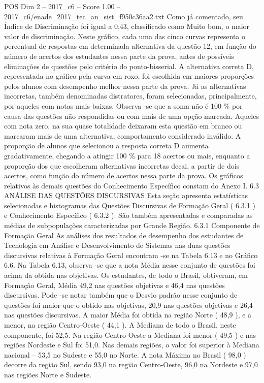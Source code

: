 \begin{textsample}{POS Dim 2 – 2017\_c6 – Score 1.00 – 2017\_c6/enade\_2017\_tec\_an\_sist\_f950c36aa2.txt}
Como já comentado, seu Índice de Discriminação foi igual a 0,43, classificado como Muito bom, o maior valor de discriminação.
Neste gráfico, cada uma das cinco curvas representa o percentual de respostas em determinada alternativa da questão 12, em função do número de acertos dos estudantes nessa parte da prova, antes de possíveis eliminações de questões pelo critério do ponto-bisserial.
A alternativa correta D, representada no gráfico pela curva em roxo, foi escolhida em maiores proporções pelos alunos com desempenho melhor nessa parte da prova.
Já as alternativas incorretas, também denominadas distratores, foram selecionadas, principalmente, por aqueles com notas mais baixas.
Observa -se que a soma não é 100 \% por causa das questões não respondidas ou com mais de uma opção marcada.
Aqueles com nota zero, na sua quase totalidade deixaram esta questão em branco ou marcaram mais de uma alternativa, comportamento considerado inválido.
A proporção de alunos que selecionou a resposta correta D aumenta gradativamente, chegando a atingir 100 \% para 18 acertos ou mais, enquanto a proporção dos que escolheram alternativas incorretas decai, a partir de dois acertos, como função do número de acertos nessa parte da prova.
Os gráficos relativos às demais questões do Conhecimento Específico constam do Anexo I. 6.3 ANÁLISE DAS QUESTÕES DISCURSIVAS Esta seção apresenta estatísticas selecionadas e histogramas das Questões Discursivas de Formação Geral ( 6.3.1 ) e Conhecimento Específico ( 6.3.2 ).
São também apresentadas e comparadas as médias de subpopulações caracterizadas por Grande Região. 6.3.1 Componente de Formação Geral As análises dos resultados de desempenho dos estudantes de Tecnologia em Análise e Desenvolvimento de Sistemas nas duas questões discursivas relativas à Formação Geral encontram -se na Tabela 6.13 e no Gráfico 6.6.
Na Tabela 6.13, observa -se que a nota Média nesse conjunto de questões foi acima da obtida nas objetivas.
Os estudantes, de todo o Brasil, obtiveram, em Formação Geral, Média 49,2 nas questões objetivas e 46,4 nas questões discursivas.
Pode -se notar também que o Desvio padrão nesse conjunto de questões foi maior que o obtido nas objetivas, 20,9 nas questões objetivas e 26,4 nas questões discursivas.
A maior Média foi obtida na região Norte ( 48,9 ), e a menor, na região Centro-Oeste ( 44,1 ).
A Mediana de todo o Brasil, neste componente, foi 52,5.
Na região Centro-Oeste a Mediana foi menor ( 49,5 ) e nas regiões Nordeste e Sul foi 51,0.
Nas demais regiões, o valor foi superior à Mediana nacional – 53,5 no Sudeste e 55,0 no Norte.
A nota Máxima no Brasil ( 98,0 ) decorre da região Sul, sendo 93,0 na região Centro-Oeste, 96,0 na Nordeste e 97,0 nas regiões Norte e Sudeste.

\end{textsample}
